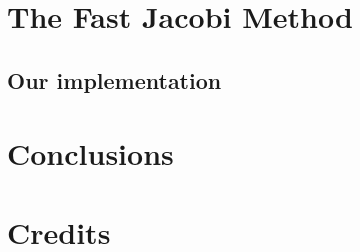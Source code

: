 \documentclass[10pt]{article}
\begin{document}
\section{The Fast Jacobi Method}
\subsection{Our implementation}

\section{Conclusions}




\section{Credits}
\end{document}
